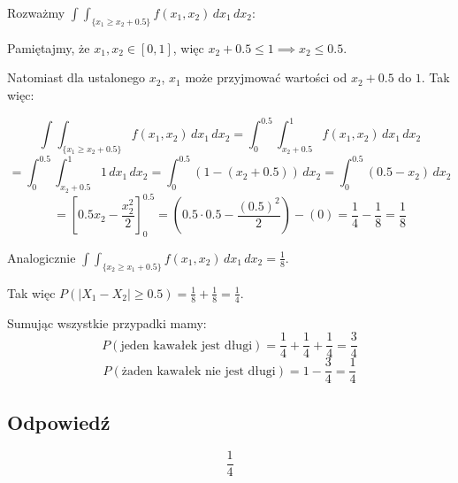 Rozważmy \(\int \int_{\{x_1 \geq x_2 + 0.5\}} f(x_1, x_2) \, dx_1 \, dx_2\):

Pamiętajmy, że \(x_1, x_2 \in [0, 1]\), więc \(x_2 + 0.5 \leq 1 \implies x_2 \leq 0.5\).

Natomiast dla ustalonego \(x_2\), \(x_1\) może przyjmować wartości od \(x_2 + 0.5\) do \(1\). Tak więc:

\[
	\int \int_{\{x_1 \geq x_2 + 0.5\}} f(x_1, x_2) \, dx_1 \, dx_2 = \int_{0}^{0.5} \int_{x_2 + 0.5}^{1} f(x_1, x_2) \, dx_1 \, dx_2
\]
\[
	= \int_{0}^{0.5} \int_{x_2 + 0.5}^{1} 1 \, dx_1 \, dx_2 = \int_{0}^{0.5} (1 - (x_2 + 0.5)) \, dx_2 = \int_{0}^{0.5} (0.5 - x_2) \, dx_2
\]
\[
	= \left[0.5x_2 - \frac{x_2^2}{2}\right]_{0}^{0.5} = \left(0.5 \cdot 0.5 - \frac{(0.5)^2}{2}\right) - (0) = \frac{1}{4} - \frac{1}{8} = \frac{1}{8}
\]

Analogicznie \(\int \int_{\{x_2 \geq x_1 + 0.5\}} f(x_1, x_2) \, dx_1 \, dx_2 = \frac{1}{8}\).

Tak więc \(P(|X_1 - X_2| \geq 0.5) = \frac{1}{8} + \frac{1}{8} = \frac{1}{4}\).

\medbreak
Sumując wszystkie przypadki mamy:
\[
	P(\text{jeden kawałek jest długi}) = \frac{1}{4} + \frac{1}{4} + \frac{1}{4} = \frac{3}{4}
\]
\[
	P(\text{żaden kawałek nie jest długi}) = 1 - \frac{3}{4} = \frac{1}{4}
\]

\subsection*{Odpowiedź}
\[
	\boxed{\frac{1}{4}}
\]
